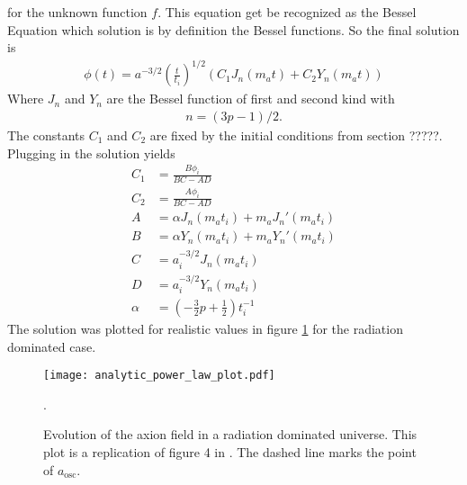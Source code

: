 \documentclass[a4paper]{article}
\begin{document}
for the unknown function $f$.
This equation get be recognized as the Bessel Equation which solution is by definition
the Bessel functions.
So the final solution is
\begin{align}
    \label{eq:power_law_solution}
    \phi(t) = a^{-3/2} \left(\frac{t}{t_i}\right)^{1/2}\left(C_1 J_n(m_a t) + C_2 Y_n(m_a t)\right)
\end{align}
Where $J_n$ and $Y_n$ are the Bessel function of first and second kind with
\begin{align}
    n = (3p - 1) / 2.
\end{align}
The constants $C_1$ and $C_2$ are fixed by the initial conditions from section ?????.
Plugging in the solution yields
\begin{align*}
    C_1 &= \frac{B \phi_i}{BC - AD} \\
    C_2 &= \frac{A \phi_i}{BC - AD} \\
    A &= \alpha J_n(m_a t_i) + m_a J_n'(m_a t_i) \\
    B &= \alpha Y_n(m_a t_i) + m_a Y_n'(m_a t_i) \\
    C &= a_i^{-3/2} J_n(m_a t_i) \\
    D &= a_i^{-3/2} Y_n(m_a t_i) \\
    \alpha &= (-\frac{3}{2} p + \frac{1}{2}) t_i^{-1}
\end{align*}
The solution was plotted for realistic values in figure \ref{fig:rad_dom_ax_field} for the radiation dominated case.
\begin{figure}
    \centering
    \texttt{[image: analytic\_power\_law\_plot.pdf]}
    \caption{Evolution of the axion field in a radiation dominated universe. This plot is a replication of figure 4 in \cite{MarshAxionCosmo}. The dashed line marks the point of $a_\mathrm{osc}$.}
    \label{fig:rad_dom_ax_field}. 
\end{figure}
\end{document}
